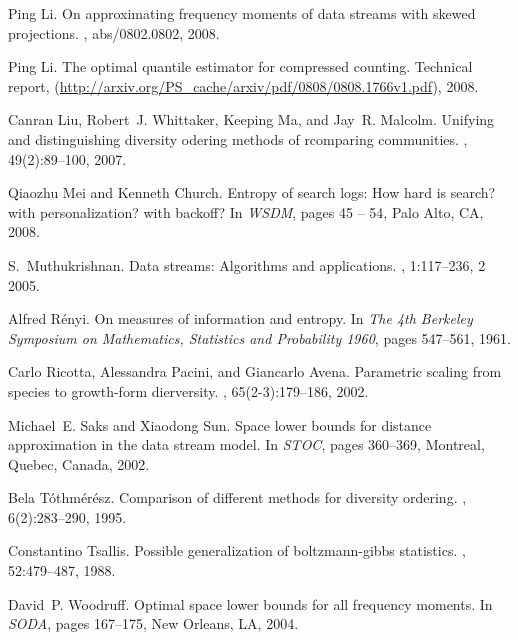 \documentclass{sig-alternate}
\begin{document}
\begin{thebibliography}{10}
Ping Li.
\newblock On approximating frequency moments of data streams with skewed
  projections.
, abs/0802.0802, 2008.

Ping Li.
\newblock The optimal quantile estimator for compressed counting.
\newblock Technical report, (\url{http://arxiv.org/PS_cache/arxiv/pdf/0808/0808.1766v1.pdf}), 2008.

Canran Liu, Robert~J. Whittaker, Keeping Ma, and Jay~R. Malcolm.
\newblock Unifying and distinguishing diversity odering methods of rcomparing
  communities.
, 49(2):89--100, 2007.

Qiaozhu Mei and Kenneth Church.
\newblock Entropy of search logs: How hard is search? with personalization?
  with backoff?
\newblock In {\em WSDM}, pages 45 -- 54, Palo Alto, CA, 2008.

S.~Muthukrishnan.
\newblock Data streams: Algorithms and applications.
,
  1:117--236, 2 2005.

Alfred R\'enyi.
\newblock On measures of information and entropy.
\newblock In {\em The 4th Berkeley Symposium on Mathematics, Statistics and
  Probability 1960}, pages 547--561, 1961.

Carlo Ricotta, Alessandra Pacini, and Giancarlo Avena.
\newblock Parametric scaling from species to growth-form dierversity.
, 65(2-3):179--186, 2002.

Michael~E. Saks and Xiaodong Sun.
\newblock Space lower bounds for distance approximation in the data stream
  model.
\newblock In {\em STOC}, pages 360--369, Montreal, Quebec, Canada, 2002.

Bela T\'othm\'er\'esz.
\newblock Comparison of different methods for diversity ordering.
, 6(2):283--290, 1995.

Constantino Tsallis.
\newblock Possible generalization of boltzmann-gibbs statistics.
, 52:479--487, 1988.

David~P. Woodruff.
\newblock Optimal space lower bounds for all frequency moments.
\newblock In {\em SODA}, pages 167--175, New Orleans, LA, 2004.


\end{thebibliography}
\end{document}
